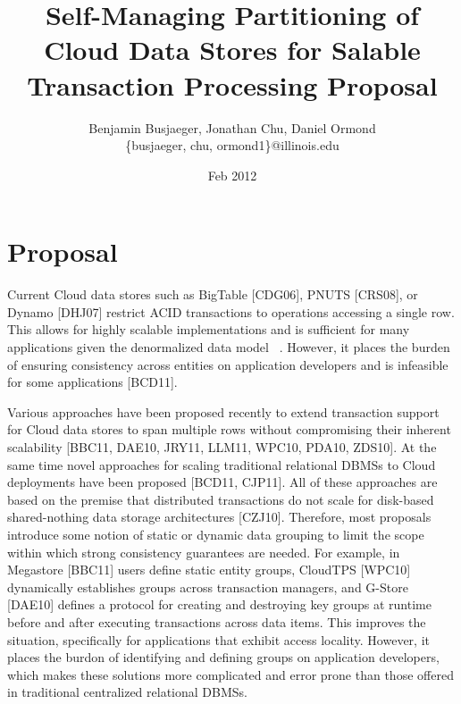\documentclass[10pt,final,journal]{IEEEtran}
\begin{document}
\title{Self-Managing Partitioning of Cloud Data Stores for Salable Transaction Processing Proposal}
\author{Benjamin Busjaeger, Jonathan Chu, Daniel Ormond \\
\{busjaeger, chu, ormond1\}@illinois.edu}
\date{Feb 2012}
\maketitle



\section{Proposal}
Current Cloud data stores such as BigTable [CDG06], PNUTS [CRS08], or Dynamo [DHJ07] restrict ACID transactions to operations accessing a single row. This allows for highly scalable implementations and is sufficient for many applications given the denormalized data model ~\cite{AEA10}. However, it places the burden of ensuring consistency across entities on application developers and is infeasible for some applications [BCD11].

Various approaches have been proposed recently to extend transaction support for Cloud data stores to span multiple rows without compromising their inherent scalability [BBC11, DAE10, JRY11, LLM11, WPC10, PDA10, ZDS10]. At the same time novel approaches for scaling traditional relational DBMSs to Cloud deployments have been proposed [BCD11, CJP11]. All of these approaches are based on the premise that distributed transactions do not scale for disk-based shared-nothing data storage architectures [CZJ10]. Therefore, most proposals introduce some notion of static or dynamic data grouping to limit the scope within which strong consistency guarantees are needed. For example, in Megastore [BBC11] users define static entity groups, CloudTPS [WPC10] dynamically establishes groups across transaction managers, and G-Store ﻿[DAE10] defines a protocol for creating and destroying key groups at runtime before and after executing transactions across data items. This improves the situation, specifically for applications that exhibit access locality. However, it places the burdon of identifying and defining groups on application developers, which makes these solutions more complicated and error prone than those offered in traditional centralized relational DBMSs.
\end{document}
